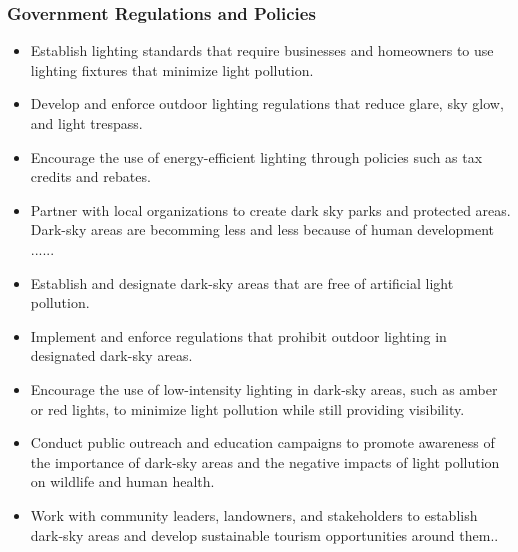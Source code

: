\subsubsection{Government Regulations and Policies}
\begin{itemize}
    \item Establish lighting standards that require businesses and homeowners to use lighting fixtures that minimize light pollution.
    
    \item Develop and enforce outdoor lighting regulations that reduce glare, sky glow, and light trespass.
    
    \item Encourage the use of energy-efficient lighting through policies such as tax credits and rebates.
    \item Partner with local organizations to create dark sky parks and protected areas.
    Dark-sky areas are becomming less and less because of human development ......

    \item Establish and designate dark-sky areas that are free of artificial light pollution.

    \item Implement and enforce regulations that prohibit outdoor lighting in designated dark-sky areas.

    \item Encourage the use of low-intensity lighting in dark-sky areas, such as amber or red lights, to minimize light pollution while still providing visibility.

    \item Conduct public outreach and education campaigns to promote awareness of the importance of dark-sky areas and the negative impacts of light pollution on wildlife and human health.

    \item Work with community leaders, landowners, and stakeholders to establish dark-sky areas and develop sustainable tourism opportunities around them..
\end{itemize}


